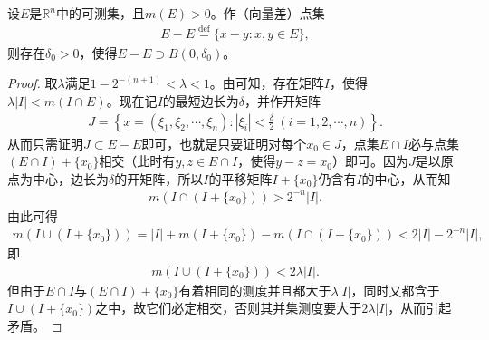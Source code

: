 \documentclass[../../main.tex]{subfiles}
\begin{document}
\begin{theorem}[Steinhaus定理]\label{theorem:Steinhaus定理}
设\(E\)是\(\mathbb{R}^n\)中的可测集，且\(m(E)>0\)。作（向量差）点集
\begin{align*}
E - E \stackrel{\text{def}}{=} \{x - y: x,y \in E\},
\end{align*}
则存在\(\delta_0>0\)，使得\(E - E \supset B(0,\delta_0)\)。
\end{theorem}
\begin{proof}
取\(\lambda\)满足\(1 - 2^{-(n + 1)}<\lambda<1\)。由可知，存在矩阵\(I\)，使得\(\lambda|I|<m(I\cap E)\)。现在记\(I\)的最短边长为\(\delta\)，并作开矩阵
\begin{align*}
J = \left\{x = (\xi_1,\xi_2,\cdots,\xi_n): |\xi_i|<\frac{\delta}{2}\ (i = 1,2,\cdots,n)\right\}.
\end{align*}
从而只需证明\(J\subset E - E\)即可，也就是只要证明对每个\(x_0\in J\)，点集\(E\cap I\)必与点集\((E\cap I)+\{x_0\}\)相交（此时有\(y,z\in E\cap I\)，使得\(y - z = x_0\)）即可。因为\(J\)是以原点为中心，边长为\(\delta\)的开矩阵，所以\(I\)的平移矩阵\(I+\{x_0\}\)仍含有\(I\)的中心，从而知
\begin{align*}
m(I\cap (I+\{x_0\}))>2^{-n}|I|.
\end{align*}
由此可得
\begin{align*}
m(I\cup (I+\{x_0\}))=|I|+m(I+\{x_0\})-m(I\cap (I+\{x_0\}))
<2|I|-2^{-n}|I|,
\end{align*}
即
\begin{align*}
m(I\cup (I+\{x_0\}))<2\lambda|I|.
\end{align*}
但由于\(E\cap I\)与\((E\cap I)+\{x_0\}\)有着相同的测度并且都大于\(\lambda|I|\)，同时又都含于\(I\cup (I+\{x_0\})\)之中，故它们必定相交，否则其并集测度要大于\(2\lambda|I|\)，从而引起矛盾。
\end{proof} 
\end{document}
